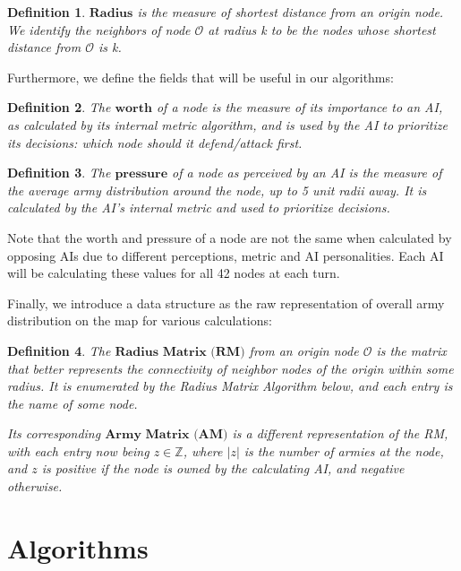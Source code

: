 \documentclass[12pt]{article}  %
\newtheorem{definition}{Definition}
\begin{document}
\begin{definition} \label{radius}
$\textbf{Radius}$ is the measure of shortest distance from an origin node. We identify the neighbors of node $\mathcal{O}$ at radius k to be the nodes whose shortest distance from $\mathcal{O}$ is k.
\end{definition}


Furthermore, we define the fields that will be useful in our algorithms:

\begin{definition} \label{worth}
The $\textbf{worth}$ of a node is the measure of its importance to an AI, as calculated by its internal metric algorithm, and is used by the AI to prioritize its decisions: which node should it defend/attack first.
\end{definition}

\begin{definition} \label{pressure}
The $\textbf{pressure}$ of a node as perceived by an AI is the measure of the average army distribution around the node, up to 5 unit radii away. It is calculated by the AI's internal metric and used to prioritize decisions.
\end{definition}

Note that the worth and pressure of a node are not the same when calculated by opposing AIs due to different perceptions, metric and AI personalities. Each AI will be calculating these values for all 42 nodes at each turn.

Finally, we introduce a data structure as the raw representation of overall army distribution on the map for various calculations:

\begin{definition} \label{RMAM}
The $\textbf{Radius Matrix (RM)}$ from an origin node $\mathcal{O}$ is the matrix that better represents the connectivity of neighbor nodes of the origin within some radius. It is enumerated by the Radius Matrix Algorithm below, and each entry is the name of some node.

Its corresponding $\textbf{Army Matrix (AM)}$ is a different representation of the RM, with each entry now being $z \in \mathbb{Z}$, where $|z|$ is the number of armies at the node, and $z$ is positive if the node is owned by the calculating AI, and negative otherwise.
\end{definition}







\section{Algorithms}
\end{document}
